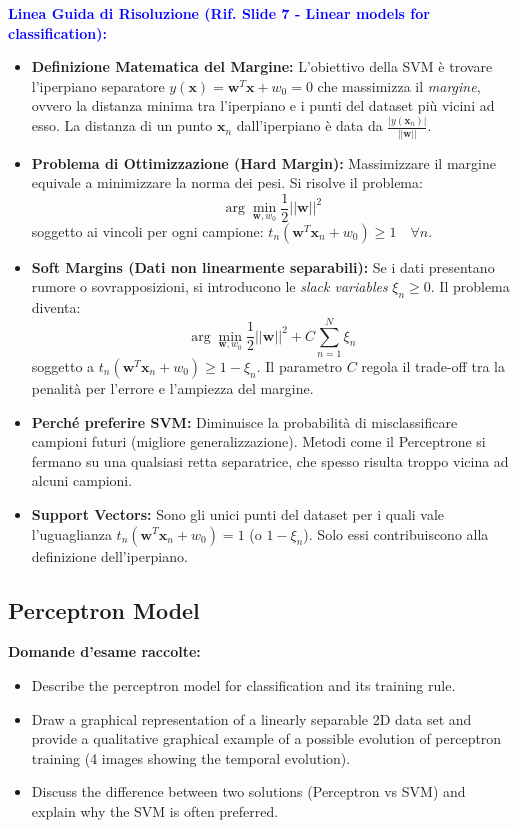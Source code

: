 \documentclass[11pt,a4paper]{article}
\begin{document}
\textbf{\textcolor{blue}{Linea Guida di Risoluzione (Rif. Slide 7 - Linear models for classification):}}
\begin{itemize}
    \item \textbf{Definizione Matematica del Margine:} L'obiettivo della SVM è trovare l'iperpiano separatore $y(\mathbf{x}) = \mathbf{w}^T\mathbf{x} + w_0 = 0$ che massimizza il \textit{margine}, ovvero la distanza minima tra l'iperpiano e i punti del dataset più vicini ad esso. La distanza di un punto $\mathbf{x}_n$ dall'iperpiano è data da $\frac{|y(\mathbf{x}_n)|}{||\mathbf{w}||}$.
    \item \textbf{Problema di Ottimizzazione (Hard Margin):} Massimizzare il margine equivale a minimizzare la norma dei pesi. Si risolve il problema:
    $$ \arg\min_{\mathbf{w}, w_0} \frac{1}{2} ||\mathbf{w}||^2 $$
    soggetto ai vincoli per ogni campione: $t_n(\mathbf{w}^T\mathbf{x}_n + w_0) \ge 1 \quad \forall n$.
    \item \textbf{Soft Margins (Dati non linearmente separabili):} Se i dati presentano rumore o sovrapposizioni, si introducono le \textit{slack variables} $\xi_n \ge 0$. Il problema diventa:
    $$ \arg\min_{\mathbf{w}, w_0} \frac{1}{2} ||\mathbf{w}||^2 + C \sum_{n=1}^N \xi_n $$
    soggetto a $t_n(\mathbf{w}^T\mathbf{x}_n + w_0) \ge 1 - \xi_n$. Il parametro $C$ regola il trade-off tra la penalità per l'errore e l'ampiezza del margine.
    \item \textbf{Perché preferire SVM:} Diminuisce la probabilità di misclassificare campioni futuri (migliore generalizzazione). Metodi come il Perceptrone si fermano su una qualsiasi retta separatrice, che spesso risulta troppo vicina ad alcuni campioni.
    \item \textbf{Support Vectors:} Sono gli unici punti del dataset per i quali vale l'uguaglianza $t_n(\mathbf{w}^T\mathbf{x}_n + w_0) = 1$ (o $1-\xi_n$). Solo essi contribuiscono alla definizione dell'iperpiano.
\end{itemize}

\subsection{Perceptron Model}
\textbf{Domande d'esame raccolte:}
\begin{itemize}
    \item Describe the perceptron model for classification and its training rule.
    \item Draw a graphical representation of a linearly separable 2D data set and provide a qualitative graphical example of a possible evolution of perceptron training (4 images showing the temporal evolution).
    \item Discuss the difference between two solutions (Perceptron vs SVM) and explain why the SVM is often preferred.
\end{itemize}
\end{document}
